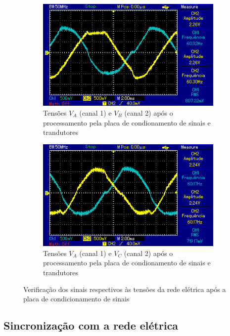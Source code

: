 \begin{figure}[!hbt]
	\centering
	\begin{subfigure}[b]{0.49\textwidth}
		\centering
		\includegraphics[width=\textwidth]{figuras/resultados_tensao_va_vb.png}
		\caption{Tensões $V_A$ (canal 1) e $V_B$ (canal 2) após o processamento pela placa de condionamento de sinais e trandutores}
	\end{subfigure}
	\begin{subfigure}[b]{0.49\textwidth}
		\centering
		\includegraphics[width=\textwidth]{figuras/resultados_tensao_va_vc.png}
		\caption{Tensões $V_A$ (canal 1) e $V_C$ (canal 2) após o processamento pela placa de condionamento de sinais e trandutores}
	\end{subfigure}

	\caption{Verificação dos sinais respectivos às tensões da rede elétrica após a placa de condicionamento de sinais}
    \label{fig:res-tensao-va-vb-bc}
\end{figure}

\subsection{Sincronização com a rede elétrica}

